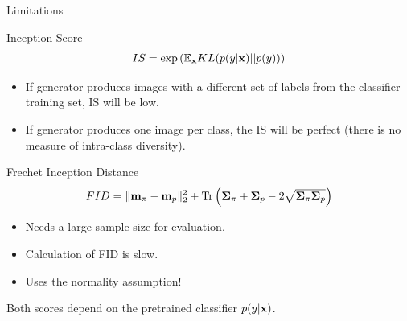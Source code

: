 \begin{frame}{Limitations}
	\vspace{-0.5cm}
	\begin{block}{Inception Score}
		\vspace{-0.5cm}
		\[
			IS =  \exp \left( \mathbb{E}_{\mathbf{x}} KL(p(y | \mathbf{x}) || p(y)) \right)
		\]
		\vspace{-0.7cm}
	\end{block}
	\begin{itemize}
		\item If generator produces images with a different set of labels from the classifier training set, IS will be low.
		\item If generator produces one image per class, the IS will be perfect (there is no measure of intra-class diversity).
	\end{itemize}
	\begin{block}{Frechet Inception Distance}
		\vspace{-0.4cm}
		\[
			FID = \| \mathbf{m}_{\pi} - \mathbf{m}_{p}\|_2^2 + \text{Tr} \left( \boldsymbol{\Sigma}_{\pi} + \boldsymbol{\Sigma}_p - 2 \sqrt{\boldsymbol{\Sigma}_{\pi} \boldsymbol{\Sigma}_p} \right)
		\]
		\vspace{-0.7cm}
	\end{block}
	\begin{itemize}
		\item Needs a large sample size for evaluation.
		\item Calculation of FID is slow.
		\item Uses the normality assumption!
	\end{itemize}
	Both scores depend on the pretrained classifier $p(y | \mathbf{x})$.

\end{frame}

